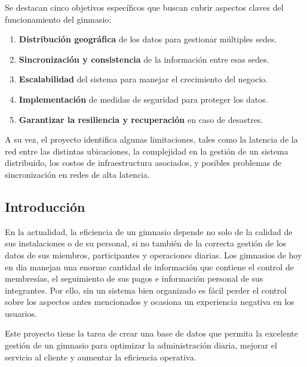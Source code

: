 \documentclass[spanish, 12pt]{article}
\providecommand{\tightlist}{\setlength{\itemsep}{0pt}
\setlength{\parskip}{0pt}}
\begin{document}
	Se destacan cinco objetivos específicos que buscan cubrir aspectos claves del
	funcionamiento del gimnasio:

	\begin{enumerate}
		\def\labelenumi{\arabic{enumi}.} \tightlist

		\item \textbf{Distribución geográfica} de los datos para gestionar múltiples
			sedes.

		\item \textbf{Sincronización y consistencia} de la información entre esas
			sedes.

		\item \textbf{Escalabilidad} del sistema para manejar el crecimiento del
			negocio.

		\item \textbf{Implementación} de medidas de seguridad para proteger los
			datos.

		\item \textbf{Garantizar la resiliencia y recuperación} en caso de desastres.
	\end{enumerate}

	A su vez, el proyecto identifica algunas limitaciones, tales como la latencia de
	la red entre las distintas ubicaciones, la complejidad en la gestión de un
	sistema distribuido, los costos de infraestructura asociados, y posibles
	problemas de sincronización en redes de alta latencia.

	\subsection{Introducción}
	\label{introducciuxf3n}

	En la actualidad, la eficiencia de un gimnasio depende no solo de la calidad
	de sus instalaciones o de su personal, si no también de la correcta gestión de
	los datos de sus miembros, participantes y operaciones diarias. Los gimnasios de
	hoy en dia manejan una enorme cantidad de información que contiene el control de
	membresías, el seguimiento de sus pagos e información personal de sus
	integrantes. Por ello, sin un sistema bien organizado es fácil perder el
	control sobre los aspectos antes mencionados y ocasiona un experiencia
	negativa en los usuarios.

	Este proyecto tiene la tarea de crear una base de datos que permita la
	excelente gestión de un gimnasio para optimizar la administración diaria, mejorar
	el servicio al cliente y aumentar la eficiencia operativa.
\end{document}
